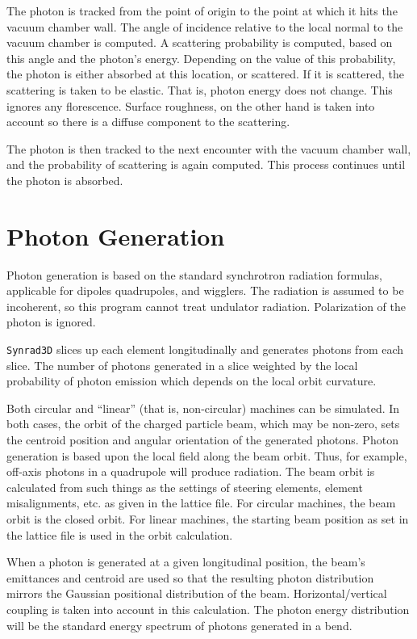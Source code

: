 \documentclass[11pt,openany]{report}
\newcommand{\srthree}{\texttt{Synrad3D}\xspace}
\begin{document}
The photon is tracked from the point of origin to
the point at which it hits the vacuum chamber wall. The angle of
incidence relative to the local normal to the vacuum chamber is
computed. A scattering probability is computed, based on this angle
and the photon's energy. Depending on the value of this probability,
the photon is either absorbed at this location, or scattered. If it is
scattered, the scattering is taken to be elastic. That is, photon
energy does not change. This ignores any florescence. Surface
roughness, on the other hand is taken into account so there is a
diffuse component to the scattering.

The photon is then tracked to the next encounter with the vacuum
chamber wall, and the probability of scattering is again
computed. This process continues until the photon is absorbed.

\section{Photon Generation}

Photon generation is based on the standard synchrotron radiation
formulas, applicable for dipoles quadrupoles, and wigglers. The
radiation is assumed to be incoherent, so this program cannot treat
undulator radiation. Polarization of the photon is ignored.

\srthree slices up each element longitudinally
and generates photons from each slice. The number of photons generated
in a slice weighted by the local probability of photon emission which
depends on the local orbit curvature.

Both circular and ``linear'' (that is, non-circular) machines can be
simulated.  In both cases, the orbit of the charged particle beam,
which may be non-zero, sets the centroid position and angular
orientation of the generated photons. Photon generation is based upon
the local field along the beam orbit. Thus, for example, off-axis
photons in a quadrupole will produce radiation. The beam orbit is
calculated from such things as the settings of steering elements,
element misalignments, etc. as given in the lattice file. For circular
machines, the beam orbit is the closed orbit. For linear machines, the
starting beam position as set in the lattice file is used in the orbit
calculation.

When a photon is generated at a given longitudinal position, the
beam's emittances and centroid are used so that the resulting photon
distribution mirrors the Gaussian positional distribution of the beam.
Horizontal/vertical coupling is taken into account in this
calculation. The photon energy distribution will be the standard
energy spectrum of photons generated in a bend.
\end{document}
